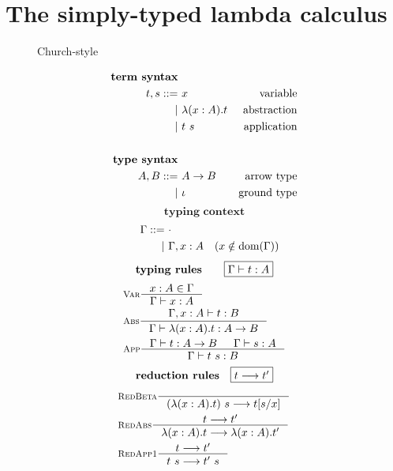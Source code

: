 \section{The simply-typed lambda calculus}\label{sec:stlc}
\begin{figure}
\begin{singlespace}
\begin{minipage}{.46\textwidth}
	\begin{center}Church-style\end{center}
\def\baselinestretch{0}
\small
\begin{align*}
\textbf{term syntax} \\
t,s ::= &~ x           & \text{variable}    \\
      | &~ \lambda(x:A) . t & \text{abstraction} \\
      | &~ t ~ s       & \text{application} \\
\\
\textbf{type syntax} \\
A,B ::= &~ A -> B  & \text{arrow type} \\
      | &~ \iota   & \text{ground type}   \\
\end{align*}
\[ \textbf{typing context} \]\vspace*{-1em}
\begin{align*}\quad
\Gamma ::= &~ \cdot \\
	 | &~ \Gamma, x:A \quad (x\notin \mathop{\mathrm{dom}}(\Gamma)) \\
\end{align*}
\[ \textbf{typing rules}
	\qquad \framebox{$\Gamma |- t : A$} \]
\vspace*{-1em}
\begin{align*}
& \inference[\sc Var]{x:A \in \Gamma}{\Gamma |- x:A} \\
& \inference[\sc Abs]{\Gamma,x:A |- t : B}
		     {\Gamma |- \l(x:A).t : A -> B} \\
& \inference[\sc App]{\Gamma |- t : A -> B & \Gamma |- s : A}
		     {\Gamma |- t~s : B} \\
\end{align*}
\[ \textbf{reduction rules}
	\quad \framebox{$t --> t'$} \]
\vspace*{-1em}
\begin{align*}
& \inference[\sc RedBeta]{}{(\l(x:A).t)~s --> t[s/x]} \\
& \inference[\sc RedAbs]{t --> t'}{\l(x:A).t --> \l(x:A).t'} \\
& \inference[\sc RedApp1]{t --> t'}{t~s --> t'~s} \\

\end{align*}
\end{minipage}
\end{singlespace}
\end{figure}
